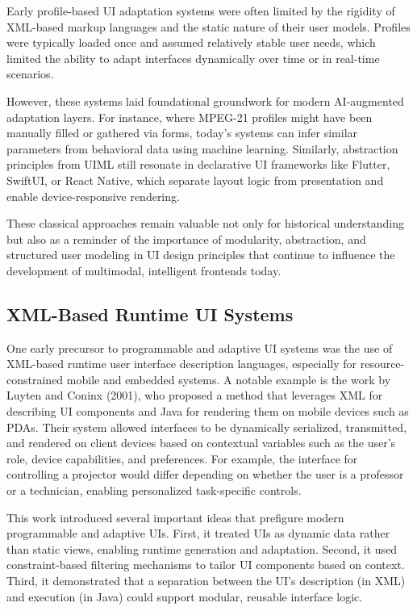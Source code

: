 \documentclass[openany]{book}
\begin{document}
Early profile-based UI adaptation systems were often limited by the rigidity of XML-based markup languages and the static nature of their user models. Profiles were typically loaded once and assumed relatively stable user needs, which limited the ability to adapt interfaces dynamically over time or in real-time scenarios.

However, these systems laid foundational groundwork for modern AI-augmented adaptation layers. For instance, where MPEG-21 profiles might have been manually filled or gathered via forms, today’s systems can infer similar parameters from behavioral data using machine learning. Similarly, abstraction principles from UIML still resonate in declarative UI frameworks like Flutter, SwiftUI, or React Native, which separate layout logic from presentation and enable device-responsive rendering.

These classical approaches remain valuable not only for historical understanding but also as a reminder of the importance of modularity, abstraction, and structured user modeling in UI design principles that continue to influence the development of multimodal, intelligent frontends today.

\subsection{XML-Based Runtime UI Systems}

One early precursor to programmable and adaptive UI systems was the use of XML-based runtime user interface description languages, especially for resource-constrained mobile and embedded systems. A notable example is the work by Luyten and Coninx (2001), who proposed a method that leverages XML for describing UI components and Java for rendering them on mobile devices such as PDAs. Their system allowed interfaces to be dynamically serialized, transmitted, and rendered on client devices based on contextual variables such as the user's role, device capabilities, and preferences. For example, the interface for controlling a projector would differ depending on whether the user is a professor or a technician, enabling personalized task-specific controls.

This work introduced several important ideas that prefigure modern programmable and adaptive UIs. First, it treated UIs as dynamic data rather than static views, enabling runtime generation and adaptation. Second, it used constraint-based filtering mechanisms to tailor UI components based on context. Third, it demonstrated that a separation between the UI's description (in XML) and execution (in Java) could support modular, reusable interface logic.
\end{document}
